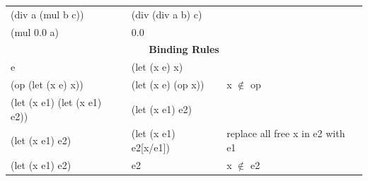 \documentclass[fullpage,twocolumn]{article} %
\begin{document}
\begin{table}
\begin{tabular}{lll}
 (div a (mul b c)) & (div (div a b) c) \\
 (mul 0.0 a) & 0.0 \\
       \multicolumn{3}{c}{{\bf Binding Rules}} \\
        e & (let (x e) x) \\ 
        (op (let (x e) x)) & (let (x e) (op x)) & x $\notin$ op \\
        (let (x e1) (let (x e1) e2)) & (let (x e1) e2) \\
        (let (x e1) e2) & (let (x e1) e2[x/e1]) & replace all free x in e2 with e1 \\
        (let (x e1) e2) & e2 & x $\notin$ e2 \\
   \bottomrule
  \end{tabular}
  \label{tbl:rules}
\end{table}
        
\end{document}
